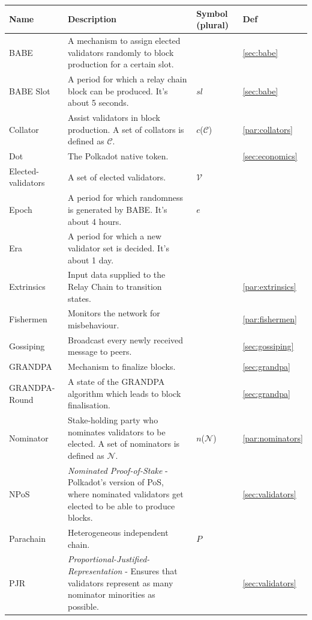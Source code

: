 \documentclass{article}
\newcommand{\Nom}{\ensuremath{\mathcal{N}}} %
\newcommand{\Val}{\ensuremath{\mathcal{V}}} %
\newcommand{\nom}{\ensuremath{n}} %
\newcommand{\col}{\ensuremath{c}} %
\newcommand{\Par}{\ensuremath{P}} %
\newcommand{\Col}{\ensuremath{\mathcal{C}}} %
\newcommand{\slot}{\ensuremath{sl}} %
\newcommand{\ep}{\ensuremath{e}} %
\begin{document}
\begin{appendix}
\begin{longtable}{p{}p{}p{}p{}} \label{t:time}
	\textbf{Name}  & \textbf{Description} & \textbf{Symbol} (plural)& \textbf{Def} \\
	\hline
	BABE & A mechanism to assign elected validators randomly to block production for a certain slot. && \ref{sec:babe} \\
	BABE Slot & A period for which a relay chain block can be produced. It's about 5 seconds. & \slot & \ref{sec:babe} \\
	Collator & Assist validators in block production. A set of collators is defined as \Col . & \col (\Col) & \ref{par:collators} \\
	Dot & The Polkadot native token. && \ref{sec:economics} \\
	Elected\newline- validators & A set of elected validators. & \Val & \\
	Epoch & A period for which randomness is generated by BABE. It's about 4 hours. & \ep & \\
	Era & A period for which a new validator set is decided. It's about 1 day. && \\
	Extrinsics & Input data supplied to the Relay Chain to transition states. && \ref{par:extrinsics} \\
	Fishermen & Monitors the network for misbehaviour. && \ref{par:fishermen} \\
	Gossiping & Broadcast every newly received message to peers. && \ref{sec:gossiping} \\
	GRANDPA & Mechanism to finalize blocks. && \ref{sec:grandpa} \\
	GRANDPA\newline- Round & A state of the GRANDPA algorithm which leads to block finalisation. && \ref{sec:grandpa} \\
	Nominator & Stake-holding party who nominates validators to be elected. A set of nominators is defined as \Nom . & \nom (\Nom) & \ref{par:nominators} \\
	NPoS & \emph{Nominated Proof-of-Stake} - Polkadot's version of PoS, where nominated validators get elected to be able to produce blocks. && \ref{sec:validators} \\
	Parachain & Heterogeneous independent chain. & \Par & \\
	PJR & \emph{Proportional-Justified-Representation} - Ensures that validators represent as many nominator minorities as possible. && \ref{sec:validators} \\

\end{longtable}
\end{appendix}
\end{document}
